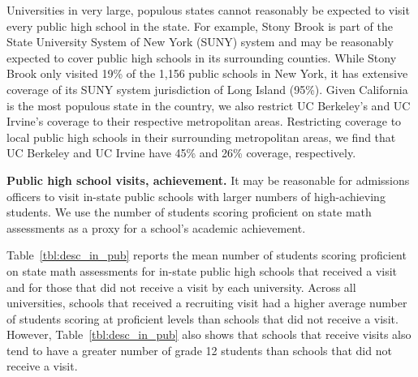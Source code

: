 \documentclass[twoside]{article}
\begin{document}


Universities in very large, populous states cannot reasonably be expected to visit every public high school in the state. For example, Stony Brook is part of the State University System of New York (SUNY) system and may be reasonably expected to cover public high schools in its surrounding counties. While Stony Brook only visited 19\% of the 1,156 public schools in New York, it has extensive coverage of its SUNY system jurisdiction of Long Island (95\%). Given California is the most populous state in the country, we also restrict UC Berkeley's and UC Irvine's coverage to their respective metropolitan areas. Restricting coverage to local public high schools in their surrounding metropolitan areas, we find that UC Berkeley and UC Irvine have 45\% and 26\% coverage, respectively.

\textbf{Public high school visits, achievement.} It may be reasonable for admissions officers to visit in-state public schools with larger numbers of high-achieving students. We use the number of students scoring proficient on state math assessments as a proxy for a school's academic achievement.

Table~\ref{tbl:desc_in_pub} reports the mean number of students scoring proficient on state math assessments for in-state public high schools that received a visit and for those that did not receive a visit by each university. Across all universities, schools that received a recruiting visit had a higher average number of students scoring at proficient levels than schools that did not receive a visit. However, Table~\ref{tbl:desc_in_pub} also shows that schools that receive visits also tend to have a greater number of grade 12 students than schools that did not receive a visit.
\end{document}
